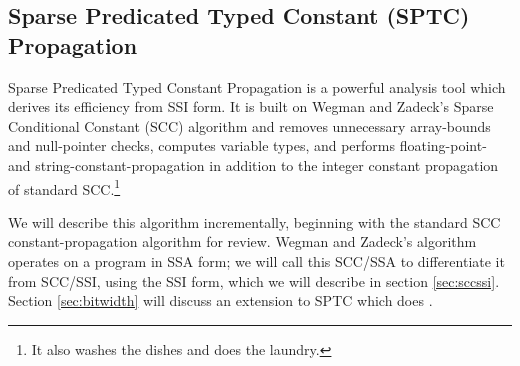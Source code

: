\documentclass[12pt,titlepage,twoside]{article}
\begin{document}
\subsection{Sparse Predicated Typed Constant (SPTC) Propagation}
Sparse Predicated Typed Constant Propagation is a powerful analysis tool which
derives its efficiency from SSI form.  It is built on Wegman and
Zadeck's Sparse Conditional Constant (SCC) algorithm
\cite{wegman91:scc} and removes unnecessary array-bounds and
null-pointer checks, computes variable types, and performs
floating-point- and string-constant-propagation in addition to the
integer constant propagation of standard SCC.\footnote{It also washes
the dishes and does the laundry.}

We will describe this algorithm incrementally, beginning with the
standard SCC constant-propagation algorithm for review.
Wegman and Zadeck's algorithm operates on a program in SSA form; we will
call this SCC/SSA to differentiate it from SCC/SSI, using the SSI
form, which we will describe in section \ref{sec:sccssi}. Section
\vref{sec:bitwidth} will discuss an extension to SPTC which does
.
\end{document}
